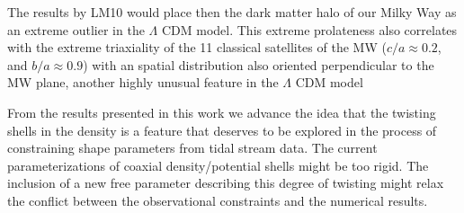 \documentclass[a4paper,fleqn,usenatbib]{mnras}
\begin{document}
The results by LM10 would place then the dark matter halo of our Milky
Way as an extreme outlier in the $\Lambda$ CDM model. 
This extreme prolateness also correlates with the extreme
triaxiality of the 11 classical satellites of the MW ($c/a\approx
0.2$, and $b/a\approx0.9$) with an spatial distribution 
also oriented perpendicular to the MW plane, another highly unusual
feature in the $\Lambda$ CDM model \citep{2018MNRAS.478.5533F}

From the results presented in this work we advance the idea that the
twisting shells in the density is a feature that deserves to be
explored in the process of constraining shape parameters from tidal
stream data. 
The current parameterizations of coaxial density/potential shells
might be too rigid.
The inclusion of a new free parameter describing this degree of
twisting might relax the conflict between the observational
constraints and the numerical results. 
\end{document}

